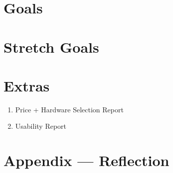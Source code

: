 \documentclass{article}
\begin{document}
\section{Goals}

\section{Stretch Goals}

\section{Extras}

\begin{enumerate}
    \item Price + Hardware Selection Report
    \item Usability Report
\end{enumerate} 

\newpage{}

\section*{Appendix --- Reflection}



\end{document}
